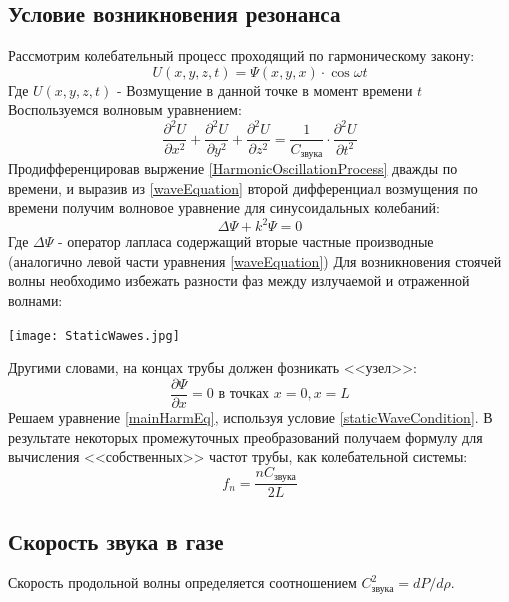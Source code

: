 \documentclass{article}
\begin{document}
\subsection{Условие возникновения резонанса}
Рассмотрим колебательный процесс проходящий по гармоническому закону:
\begin{equation}\label{HarmonicOscillationProcess}
    U(x,y,z,t) = \Psi(x,y,x) \cdot \cos{\omega t}
\end{equation}
Где $U(x,y,z,t)$ - Возмущение в данной точке в момент времени $t$
Воспользуемся волновым уравнением:
\begin{equation}\label{waveEquation}
   \frac{ \partial^2 U}{\partial x^2} + \frac{ \partial^2 U}{\partial y^2} + \frac{ \partial^2 U}{\partial z^2} = \frac{1}{C_{\text{звука}}} \cdot \frac{\partial^2 U}{\partial t^2}
\end{equation}
Продифференцировав выржение \eqref{HarmonicOscillationProcess} дважды по времени, и выразив из \eqref{waveEquation} второй дифференциал возмущения по времени получим волновое уравнение для синусоидальных колебаний:
\begin{equation}\label{mainHarmEq}
    \Delta \Psi + k^2 \Psi = 0
\end{equation}
Где $\Delta \Psi$ - оператор лапласа содержащий вторые частные производные (аналогично левой части уравнения \eqref{waveEquation})
\newpage
Для возникновения стоячей волны необходимо избежать разности фаз между излучаемой и отраженной волнами:
\begin{center}
\texttt{[image: StaticWawes.jpg]}
\end{center}
Другими словами, на концах трубы должен фозникать <<узел>>:
\begin{equation}\label{staticWaveCondition}
    \frac{\partial \Psi}{\partial x} = 0  \text{ в точках }
    x = 0, x = L
\end{equation}
Решаем уравнение \eqref{mainHarmEq}, используя условие \eqref{staticWaveCondition}. В результате некоторых промежуточных преобразований получаем формулу для вычисления <<собственных>> частот трубы, как колебательной системы:
\begin{equation}\label{resonance}
    f_{n} = \frac{n C_{\text{звука}}}{2L}
\end{equation}
\subsection{Скорость звука в газе}

Скорость продольной волны определяется соотношением $C_{\text{звука}}^2 = d P/ d \rho$. 
\end{document}
